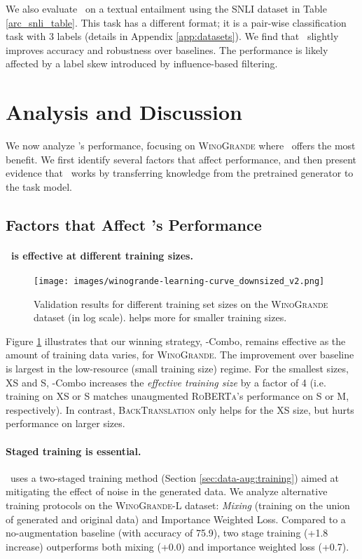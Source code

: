 \documentclass[11pt,a4paper]{article}
\newcommand{\gdaug}{}
\newcommand{\winogrande}{\textsc{WinoGrande}\xspace}
\newcommand{\roberta}{\textsc{RoBERTa}\xspace}
\newcommand{\backt}{\textsc{BackTranslation}\xspace}
\begin{document}
We also evaluate \gdaug\ on a textual entailment using the SNLI dataset \cite{bowman2015large} in Table \ref{arc_snli_table}. 
This task has a different format; it is a pair-wise classification task with 3 labels (details in Appendix \ref{app:datasets}). 
We find that \gdaug\ slightly improves accuracy and robustness over baselines. The performance is likely affected by a label skew introduced by influence-based filtering.
 \section{Analysis and Discussion}
\label{sec:analysis}
We now analyze \gdaug's performance, focusing on \winogrande where \gdaug\ offers the most benefit. We first identify several factors that affect performance, and then present evidence that \gdaug\ works by transferring knowledge from the pretrained generator to the task model.

\subsection{Factors that Affect \gdaug's Performance}

\paragraph{\gdaug\ is effective at different training sizes.}
\begin{figure}[t!]
\centering
  \texttt{[image: images/winogrande-learning-curve\_downsized\_v2.png]}
  \caption{Validation results for different training set sizes on the \winogrande dataset (in log scale).  \gdaug helps more for smaller training sizes.}
  \label{fig:winogrande-lc}
\end{figure}
Figure \ref{fig:winogrande-lc} illustrates that our winning strategy, \gdaug-Combo, remains effective as the amount of training data varies, for \winogrande.
The improvement over baseline is largest in the low-resource (small training size) regime.
For the smallest sizes, XS and S, \gdaug-Combo increases the \textit{effective training size} by a factor of 4 (i.e. training on XS or S matches unaugmented \roberta's performance on S or M, respectively). 
In contrast, \backt only helps for the XS size, but hurts performance on larger sizes.


\paragraph{Staged training is essential.} 
\gdaug\ uses a two-staged training method (Section \ref{sec:data-aug:training}) aimed at mitigating the effect of noise in the generated data. 
We analyze alternative training protocols on the \winogrande-L dataset: {\em Mixing} (training on the union of generated and original data) and Importance Weighted Loss. Compared to a no-augmentation baseline (with accuracy of 75.9), two stage training (+1.8 increase) outperforms both mixing (+0.0) and importance weighted loss (+0.7).
\end{document}
